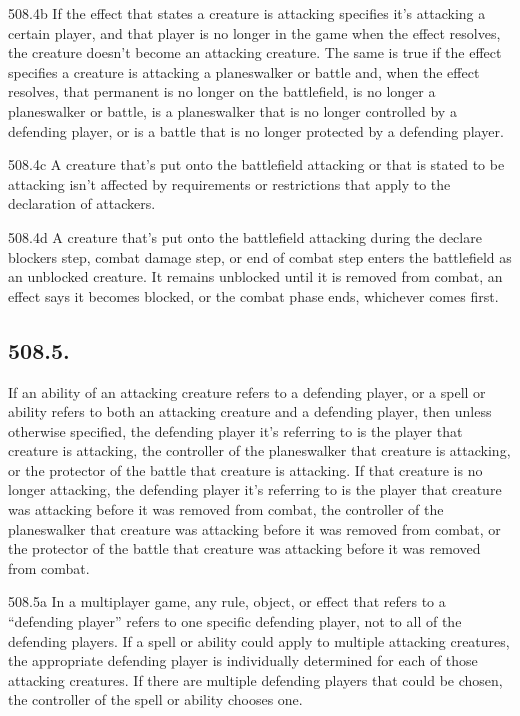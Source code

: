 508.4b If the effect that states a creature is attacking specifies it’s attacking a certain player, and that player is no longer in the game when the effect resolves, the creature doesn’t become an attacking creature. The same is true if the effect specifies a creature is attacking a planeswalker or battle and, when the effect resolves, that permanent is no longer on the battlefield, is no longer a planeswalker or battle, is a planeswalker that is no longer controlled by a defending player, or is a battle that is no longer protected by a defending player.

508.4c A creature that’s put onto the battlefield attacking or that is stated to be attacking isn’t affected by requirements or restrictions that apply to the declaration of attackers.

508.4d A creature that’s put onto the battlefield attacking during the declare blockers step, combat damage step, or end of combat step enters the battlefield as an unblocked creature. It remains unblocked until it is removed from combat, an effect says it becomes blocked, or the combat phase ends, whichever comes first.

\subsection*{508.5.}
If an ability of an attacking creature refers to a defending player, or a spell or ability refers to both an attacking creature and a defending player, then unless otherwise specified, the defending player it’s referring to is the player that creature is attacking, the controller of the planeswalker that creature is attacking, or the protector of the battle that creature is attacking. If that creature is no longer attacking, the defending player it’s referring to is the player that creature was attacking before it was removed from combat, the controller of the planeswalker that creature was attacking before it was removed from combat, or the protector of the battle that creature was attacking before it was removed from combat.

508.5a In a multiplayer game, any rule, object, or effect that refers to a “defending player” refers to one specific defending player, not to all of the defending players. If a spell or ability could apply to multiple attacking creatures, the appropriate defending player is individually determined for each of those attacking creatures. If there are multiple defending players that could be chosen, the controller of the spell or ability chooses one.

